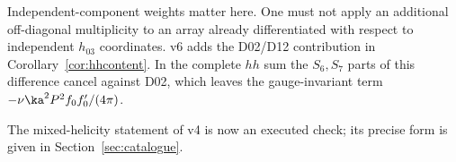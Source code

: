 Independent-component weights matter here.
One must not apply an additional off-diagonal multiplicity to an
array already differentiated with respect to independent
\(h_{03}\) coordinates.
v6 adds the D02/D12 contribution in
Corollary~\ref{cor:hhcontent}.
In the complete \(hh\) sum the \(S_6,S_7\) parts of this difference
cancel against D02, which leaves the gauge-invariant term
\(-\nu\ka^2P^2f_0f_0'/(4\pi)\).

The mixed-helicity statement of v4 is now an executed check; its
precise form is given in Section~\ref{sec:catalogue}.
